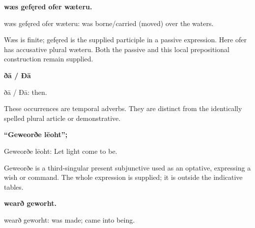\textbf{wæs gefęred ofer wæteru.}

wæs gefęred ofer wæteru: was borne/\allowbreak{}carried (moved) over the waters.

Wæs is finite; gefęred is the supplied participle in a passive expression. Here ofer has accusative plural wæteru. Both the passive and this local prepositional construction remain supplied.

\textbf{ðā /\allowbreak{} Ðā}

ðā /\allowbreak{} Ðā: then.

These occurrences are temporal adverbs. They are distinct from the identically spelled plural article or demonstrative.

\textbf{“Geweorðe lēoht”;}

Geweorðe lēoht: Let light come to be.

Geweorðe is a third-singular present subjunctive used as an optative, expressing a wish or command. The whole expression is supplied; it is outside the indicative tables.

\textbf{wearð geworht.}

wearð geworht: was made; came into being.

